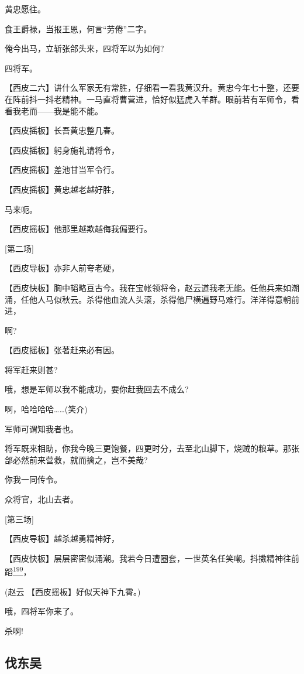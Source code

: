 黄忠愿往。

食王爵禄，当报王恩，何言``劳倦''二字。

俺今出马，立斩张郃头来，四将军以为如何?

四将军。

【西皮二六】讲什么军家无有常胜，仔细看一看我黄汉升。黄忠今年七十整，还要在阵前抖一抖老精神。一马直将曹营进，恰好似猛虎入羊群。眼前若有军师令，看看我老而------我是能不能。

【西皮摇板】长吾黄忠整几春。

【西皮摇板】躬身施礼请将令，

【西皮摇板】差池甘当军令行。

【西皮摇板】黄忠越老越好胜，

马来呃。

【西皮摇板】他那里越欺越侮我偏要行。

{[}第二场{]}

【西皮导板】亦非人前夸老硬，

【西皮快板】胸中韬略亘古今。我在宝帐领将令，赵云道我老无能。任他兵来如潮涌，任他人马似秋云。杀得他血流人头滚，杀得他尸横遍野马难行。洋洋得意朝前进，

啊?

【西皮摇板】张著赶来必有因。

将军赶来则甚?

哦，想是军师以我不能成功，要你赶我回去不成么?

啊，哈哈哈哈\ldots{}\ldots{}(笑介)

军师可谓知我者也。

将军既来相助，你我今晚三更饱餐，四更时分，去至北山脚下，烧贼的粮草。那张郃必然前来营救，就而擒之，岂不美哉?

你我一同传令。

众将官，北山去者。

{[}第三场{]}

【西皮导板】越杀越勇精神好，

【西皮快板】层层密密似涌潮。我若今日遭圈套，一世英名任笑嘲。抖擞精神往前蹈\protect\hyperlink{fn199}{\textsuperscript{199}}，

(赵云 【西皮摇板】好似天神下九霄。)

哦，四将军你来了。

杀啊!

\hypertarget{ux4f10ux4e1cux5434}{%
\subsection{伐东吴}\label{ux4f10ux4e1cux5434}}

